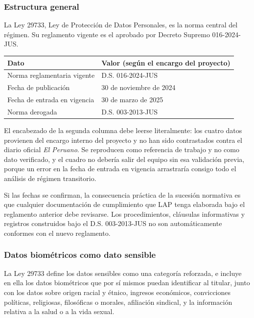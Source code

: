 \subsubsection{Estructura general}

La Ley 29733, Ley de Protección de Datos Personales, es la norma central
del régimen. Su reglamento vigente es el aprobado por Decreto Supremo
016-2024-JUS.

\begin{center}
\small
\begin{tabularx}{\linewidth}{@{}L{4.6cm}Y@{}}
\toprule
\textbf{Dato} & \textbf{Valor (según el encargo del proyecto)} \\
\midrule
Norma reglamentaria vigente & D.S. 016-2024-JUS \\
Fecha de publicación & 30 de noviembre de 2024 \\
Fecha de entrada en vigencia & 30 de marzo de 2025 \\
Norma derogada & D.S. 003-2013-JUS \\
\bottomrule
\end{tabularx}
\end{center}

El encabezado de la segunda columna debe leerse literalmente: los cuatro
datos provienen del encargo interno del proyecto y no han sido
contrastados contra el diario oficial \emph{El Peruano}. Se reproducen
como referencia de trabajo y no como dato verificado, y el cuadro no
debería salir del equipo sin esa validación previa, porque un error en la
fecha de entrada en vigencia arrastraría consigo todo el análisis de
régimen transitorio.

Si las fechas se confirman, la consecuencia práctica de la sucesión
normativa es que cualquier documentación de cumplimiento que LAP tenga
elaborada bajo el reglamento anterior debe revisarse. Los procedimientos, cláusulas informativas y
registros construidos bajo el D.S. 003-2013-JUS no son automáticamente
conformes con el nuevo reglamento.

\subsubsection{Datos biométricos como dato sensible}
\label{sec:biometricos}

La Ley 29733 define los datos sensibles como una categoría reforzada, e
incluye en ella los datos biométricos que por sí mismos puedan
identificar al titular, junto con los datos sobre origen racial y étnico,
ingresos económicos, convicciones políticas, religiosas, filosóficas o
morales, afiliación sindical, y la información relativa a la salud o a la
vida sexual.

